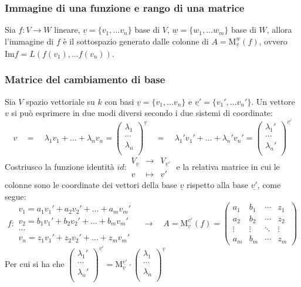 \documentclass[a4paper]{article}
\newcommand\f[4]{\begin{smallmatrix} {#1} &\to &{#2} \\ {#3} &\mapsto &{#4} \end{smallmatrix}}
\newcommand\m[2]{\text{M}_{\underline{#1}}^{\underline{#2}}}
\newcommand\img{\text{Im}}		%
\begin{document}
\newpage

\subsubsection*{Immagine di una funzione e rango di una matrice}
Sia \(f:V \to W\) lineare, \(\underline{v} = \{v_1, \dots v_n\}\) base di \(V\), \(\underline{w} = \{w_1, \dots w_m\}\) base di \(W\),
allora l'immagine di \(f\) è il sottospazio generato dalle colonne di \(A = \m{v}{w}(f)\), ovvero \(\img f = L(f(v_1), \dots f(v_n))\).

\subsubsection*{Matrice del cambiamento di base}
Sia \(V\) spazio vettoriale su \(k\) con basi \(\underline{v} = \{v_1, \dots v_n\}\) e \(\underline{v'} = \{v_1', \dots v_n'\}\).
Un vettore \(v\) si può esprimere in due modi diversi secondo i due sistemi di coordinate:
\[v \quad = \quad \lambda_1 v_1 + \dots + \lambda_n v_n = \begin{pmatrix} \lambda_1 \\ \cdots \\ \lambda_n \\ \end{pmatrix}^{\underline{v}}
	\quad = \quad	\lambda_1' v_1' + \dots + \lambda_n' v_n' = \begin{pmatrix} \lambda_1' \\ \cdots \\ \lambda_n' \\ \end{pmatrix}^{\underline{v'}}\]
Costriusco la funzione identità \(id: \f{V_{\underline{v}}}{V_{\underline{v'}}}{v}{v'}\) e la relativa matrice in cui le colonne
sono le coordinate dei vettori della base \(\underline{v}\) rispetto alla base \(\underline{v'}\), come segue:
\[f: \begin{matrix}
	v_1 = a_1 v_1' + a_2 v_2' + \dots + a_m v_m' \\
	v_2 = b_1 v_1' + b_2 v_2' + \dots + b_m v_m' \\
	\dots \\
	v_n = z_1 v_1' + z_2 v_2' + \dots + z_m v_m'
\end{matrix} \quad \longrightarrow \quad A = \m{v}{v'}(f) = \left( \begin{matrix}
	a_1 & b_1 & \cdots & z_1 \\
	a_2 & b_2 & \cdots & z_2 \\
	\vdots & \vdots & \ddots & \vdots \\
	a_m & b_m & \cdots & z_m
\end{matrix} \right)\]
Per cui si ha che \(\begin{pmatrix} \lambda_1' \\ \cdots \\ \lambda_n' \\ \end{pmatrix}^{\underline{v'}} = \m{v}{v'} \cdot \begin{pmatrix} \lambda_1 \\ \cdots \\ \lambda_n \\ \end{pmatrix}^{\underline{v}}\)
\end{document}
